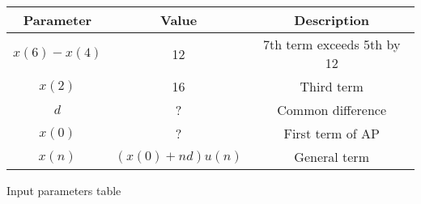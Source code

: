 
\centering
\begin{tabular}{|c|c|c|}
        \hline
        \textbf{Parameter} & \textbf{Value} & \textbf{Description} \\
        \hline
        $x(6) - x(4)$ & 12 & 7th term exceeds 5th by 12 \\
        \hline
	$x(2)$ & 16 & Third term \\
	\hline
        $d$ & ? & Common difference \\
        \hline
        $x(0)$ & ? & First term of AP \\
	\hline
        $x(n)$ & $(x(0) + nd)u(n)$ & General term \\
        \hline
\end{tabular}
\caption{Input parameters table}
\label{tab:10.5.2.16.1}
